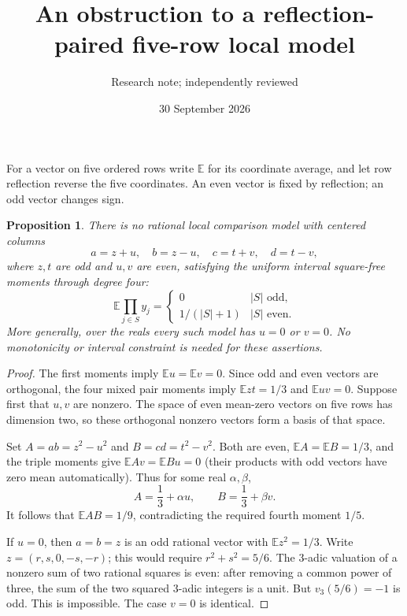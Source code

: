 \documentclass[11pt]{article}
\title{An obstruction to a reflection-paired five-row local model}
\author{Research note; independently reviewed}
\date{30 September 2026}
\newtheorem{proposition}{Proposition}
\begin{document}
\maketitle
For a vector on five ordered rows write $\mathbb E$ for its coordinate
average, and let row reflection reverse the five coordinates. An even
vector is fixed by reflection; an odd vector changes sign.

\begin{proposition}
There is no rational local comparison model with centered columns
\[
 a=z+u,\quad b=z-u,\quad c=t+v,\quad d=t-v,
\]
where $z,t$ are odd and $u,v$ are even, satisfying the uniform interval
square-free moments through degree four:
\[
 \mathbb E\prod_{j\in S}y_j=
 \begin{cases}0&|S|\text{ odd},\\1/(|S|+1)&|S|\text{ even}.
 \end{cases}
\]
More generally, over the reals every such model has $u=0$ or $v=0$.
No monotonicity or interval constraint is needed for these assertions.
\end{proposition}
\begin{proof}
The first moments imply $\mathbb Eu=\mathbb Ev=0$. Since odd and
even vectors are orthogonal, the four mixed pair moments imply
$\mathbb Ezt=1/3$ and $\mathbb Euv=0$.
Suppose first that $u,v$ are nonzero. The space of even mean-zero
vectors on five rows has dimension two, so these orthogonal nonzero
vectors form a basis of that space.

Set $A=ab=z^2-u^2$ and $B=cd=t^2-v^2$. Both are even,
$\mathbb EA=\mathbb EB=1/3$, and the triple moments give
$\mathbb EAv=\mathbb EBu=0$ (their products with odd vectors have
zero mean automatically). Thus for some real $\alpha,\beta$,
\[
 A=\frac13+\alpha u,\qquad B=\frac13+\beta v.
\]
It follows that $\mathbb EAB=1/9$, contradicting the required fourth
moment $1/5$.

If $u=0$, then $a=b=z$ is an odd rational vector with
$\mathbb Ez^2=1/3$. Write $z=(r,s,0,-s,-r)$; this would require
$r^2+s^2=5/6$. The 3-adic valuation of a nonzero sum of two rational
squares is even: after removing a common power of three, the sum of
the two squared 3-adic integers is a unit. But $v_3(5/6)=-1$ is odd.
This is impossible. The case $v=0$ is identical.
\end{proof}
\end{document}
